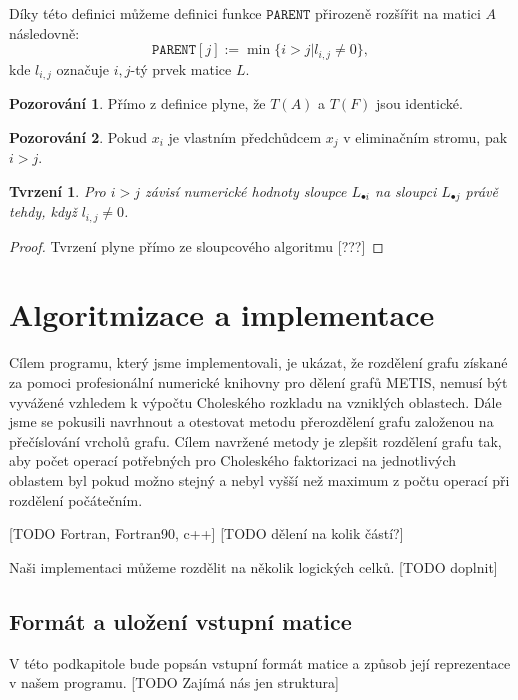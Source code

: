 \documentclass[11pt,american,czech,oneside]{book}
\theoremstyle{plain}
\newtheorem{proposition}{Tvrzení}
\theoremstyle{definition}
\newtheorem{observation}{Pozorování}
\begin{document}
Díky této definici můžeme definici funkce $\texttt{PARENT}$ přirozeně rozšířit na matici $A$ následovně:
\[
    \texttt{PARENT}[j] := \min \{i > j | l_{i,j} \neq 0\},
\]
kde $l_{i,j}$ označuje $i,j$-tý prvek matice $L$.

\begin{observation}
Přímo z definice plyne, že $T(A)$ a $T(F)$ jsou identické.
\end{observation}

\begin{observation}
Pokud $x_i$ je vlastním předchůdcem $x_j$ v eliminačním stromu, pak $i > j$.
\end{observation}

\begin{proposition}
  Pro $i>j$ závisí numerické hodnoty sloupce $L_{\bullet i}$ na sloupci $L_{\bullet j}$ právě tehdy,
  když $l_{i,j} \neq 0$.
\end{proposition}
\begin{proof}
  Tvrzení plyne přímo ze sloupcového algoritmu [???]
\end{proof}


\chapter{Algoritmizace a implementace}

Cílem programu, který jsme implementovali, je ukázat, že rozdělení grafu získané za pomoci profesionální numerické knihovny pro dělení grafů METIS, nemusí být vyvážené vzhledem k výpočtu Choleského rozkladu na vzniklých oblastech. Dále jsme se pokusili navrhnout a otestovat metodu přerozdělení grafu založenou na přečíslování vrcholů grafu. Cílem navržené metody je zlepšit rozdělení grafu tak, aby počet operací potřebných pro Choleského faktorizaci na jednotlivých oblastem byl pokud možno stejný a nebyl vyšší než maximum z počtu operací při rozdělení počátečním.

[TODO Fortran, Fortran90, c++]
[TODO dělení na kolik částí?]

Naši implementaci můžeme rozdělit na několik logických celků. [TODO doplnit]

\section{Formát a uložení vstupní matice}
V této podkapitole bude popsán vstupní formát matice a způsob její reprezentace v našem programu.
[TODO Zajímá nás jen struktura]
\end{document}
